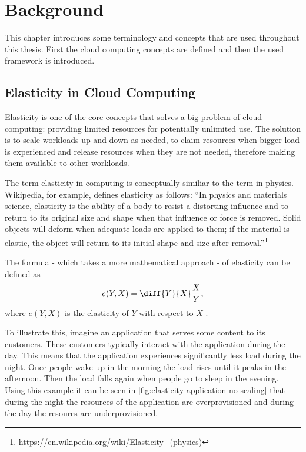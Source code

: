 \chapter{Background}
\label{ch:background}

This chapter introduces some terminology and concepts that are used throughout this thesis. First the cloud computing concepts are defined and then the used framework is introduced.

\section{Elasticity in Cloud Computing}
\label{sec:elasticity}

Elasticity is one of the core concepts that solves a big problem of cloud computing: providing limited resources for potentially unlimited use. The solution is to scale workloads up and down as needed, to claim resources when bigger load is experienced and release resources when they are not needed, therefore making them available to other workloads.

The term elasticity in computing is conceptually similiar to the term in physics. Wikipedia, for example, defines elasticity as follows: ``In physics and materials science, elasticity is the ability of a body to resist a distorting influence and to return to its original size and shape when that influence or force is removed. Solid objects will deform when adequate loads are applied to them; if the material is elastic, the object will return to its initial shape and size after removal.''\footnote{\url{https://en.wikipedia.org/wiki/Elasticity_(physics)}}

The formula - which takes a more mathematical approach - of elasticity can be defined as \[ e(Y, X) = \diff{Y}{X} \frac{X}{Y}, \] where \(e(Y, X)\) is the elasticity of \(Y\) with respect to \(X\) \cite{dustdarPrinciplesElasticProcesses2011}.

To illustrate this, imagine an application that serves some content to its customers. These customers typically interact with the application during the day. This means that the application experiences significantly less load during the night. Once people wake up in the morning the load rises until it peaks in the afternoon. Then the load falls again when people go to sleep in the evening. Using this example it can be seen in \cref{fig:elasticity-application-no-scaling} that during the night the resources of the application are overprovisioned and during the day the resoures are underprovisioned.


